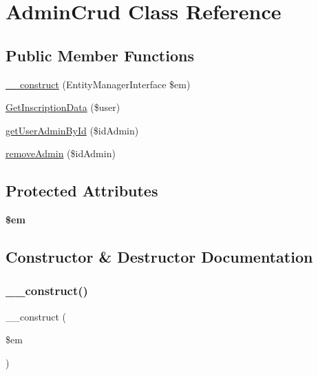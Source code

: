 \hypertarget{class_app_1_1_d_a_l_1_1_admin_crud}{}\section{Admin\+Crud Class Reference}
\label{class_app_1_1_d_a_l_1_1_admin_crud}
\subsection*{Public Member Functions}
\begin{DoxyCompactItemize}
\item 
\mbox{\hyperlink{class_app_1_1_d_a_l_1_1_admin_crud_a25f4258aeb5ce2a61a2504cb7c058485}{\+\_\+\+\_\+construct}} (Entity\+Manager\+Interface \$em)
\item 
\mbox{\hyperlink{class_app_1_1_d_a_l_1_1_admin_crud_a27ced7f805689012f068a9a83b182a39}{Get\+Inscription\+Data}} (\$user)
\item 
\mbox{\hyperlink{class_app_1_1_d_a_l_1_1_admin_crud_a9b1284e3e1a2733326abd1c013e15c15}{get\+User\+Admin\+By\+Id}} (\$id\+Admin)
\item 
\mbox{\hyperlink{class_app_1_1_d_a_l_1_1_admin_crud_a4841ba151b489ed4738f598a597446cb}{remove\+Admin}} (\$id\+Admin)
\end{DoxyCompactItemize}
\subsection*{Protected Attributes}
\begin{DoxyCompactItemize}
\item 
\mbox{\label{class_app_1_1_d_a_l_1_1_admin_crud_a0f2991d5fed029ef50ef619f1a532d06}} 
{\bfseries \$em}
\end{DoxyCompactItemize}


\subsection{Constructor \& Destructor Documentation}
\mbox{\label{class_app_1_1_d_a_l_1_1_admin_crud_a25f4258aeb5ce2a61a2504cb7c058485}} 
\subsubsection{\texorpdfstring{\_\_construct()}{\_\_construct()}}
{\footnotesize\ttfamily \+\_\+\+\_\+construct (\begin{DoxyParamCaption}\item[{Entity\+Manager\+Interface}]{\$em }\end{DoxyParamCaption})}

